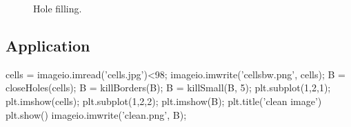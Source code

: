 \begin{figure}[htbp]
 \centering\caption{Hole filling.}%
 \hspace*{15mm}
 \label{python:bw_mm:holes}\vspace*{-8pt}%
\end{figure}

\vspace*{-12pt}

\subsection{Application}

\begin{python}
cells = imageio.imread('cells.jpg')<98;
imageio.imwrite('cellsbw.png', cells);
B = closeHoles(cells);
B = killBorders(B);
B = killSmall(B, 5);
plt.subplot(1,2,1);
plt.imshow(cells);
plt.subplot(1,2,2);
plt.imshow(B);
plt.title('clean image')
plt.show()
imageio.imwrite('clean.png', B);
\end{python}

\vspace*{-8pt}%

